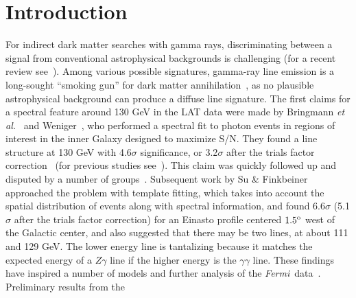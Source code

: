 \documentclass[aps,prd,superscriptaddress,nofootinbib,fixlfloat, 12pt]{revtex4-1}
\newcommand{\Fermi}{{\slshape Fermi}}
\newcommand{\degree}{^{\rm o}}
\begin{document}

\maketitle



\section{Introduction}
For indirect dark matter searches with gamma rays, discriminating between a
signal from conventional astrophysical backgrounds is challenging (for a
recent review see~\cite{Bringmann:2012ez}).  Among various possible
signatures, gamma-ray line emission is a long-sought ``smoking gun'' for dark
matter annihilation~\cite{Bergstrom:1988fp}, as no plausible astrophysical
background can produce a diffuse line signature.
%
The first claims for a spectral feature around 130 GeV in the LAT data were made by Bringmann
\textit{et al.}~\citep{Bringmann:2012} and Weniger~\citep{Weniger:2012}, who
performed a spectral fit to photon events in regions of interest in the inner
Galaxy designed to maximize S/N. They found a line structure at 130 GeV with
4.6$\sigma$ significance, or 3.2$\sigma$ after the trials factor
correction~\citep{Weniger:2012}  (for previous studies
see~\cite{Pullen:2006sy, Abdo:2010nc, Vertongen:2011mu, Ackermann:2012qk}).
This claim was quickly followed up and disputed by a number of
groups~\cite{tempel:2012ey, Boyarsky:2012ca}.  Subsequent work by Su \&
Finkbeiner approached the problem with template fitting, which takes into
account the spatial distribution of events along with spectral information,
and found 6.6$\sigma$ (5.1$\sigma$ after the trials factor correction) for an
Einasto profile centered $1.5\degree$ west of the Galactic center, and also
suggested that there may be two lines, at about 111 and 129 GeV. The lower
energy line is tantalizing because it matches the expected energy of a
$Z\gamma$ line if the higher energy is the $\gamma\gamma$ line.  These
findings have inspired a number of models and further analysis of the \Fermi\
data~\citep{Dudas:2012, Choi:2012,
Kyae:2012, Lee:2012, Rajaraman:2012, Acharya:2012, Garny:2012,
Buckley:2012, Chu:2012, Kang:2012, Buchmuller:2012, Bergstrom:2012b,
Heo:2012, Park:2012, Tulin:2012, Asano:2012zv, Cline:2012, Weiner:2012,
WeinerYavin:2012b,
FanReece:2012, Huang:2012, Whiteson:2012, Buchmuller:2012, Cholis:2012,
Rao:2012fh, Whiteson:2013cs, Carlson:2013vka}. Preliminary results from the
\end{document}
